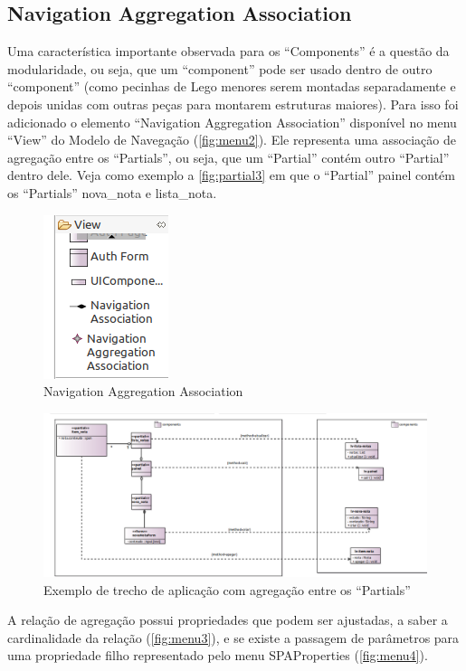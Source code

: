 \documentclass[
article,			%
11pt,				%
oneside,			%
a4paper,			%
english,			%
brazil,				%
sumario=tradicional
]{abntex2}
\begin{document}
\subsection{Navigation Aggregation Association}

Uma característica importante observada para os ``Components'' é a questão da modularidade, ou seja, que um ``component'' pode ser usado dentro de outro ``component'' (como pecinhas de Lego menores serem montadas separadamente e depois unidas com outras peças para montarem estruturas maiores). Para isso foi adicionado o elemento ``Navigation Aggregation Association'' disponível no menu ``View'' do Modelo de Navegação (\autoref{fig:menu2}). Ele representa uma associação de agregação entre os ``Partials'', ou seja, que um ``Partial'' contém outro ``Partial'' dentro dele. Veja como exemplo a \autoref{fig:partial3} em que o ``Partial'' painel contém os ``Partials'' nova\_nota e lista\_nota.

\begin{figure}
	\centering
	\includegraphics[width=0.3\linewidth]{figuras/menu2}
	\caption{Navigation Aggregation Association}
	\label{fig:menu2}
\end{figure}

\begin{figure}
	\centering
	\includegraphics[width=0.7\linewidth]{figuras/Partial3}
	\caption{Exemplo de trecho de aplicação com agregação entre os ``Partials''}
	\label{fig:partial3}
\end{figure}

A relação de agregação possui propriedades que podem ser ajustadas, a saber a cardinalidade da relação (\autoref{fig:menu3}), e se existe a passagem de parâmetros para uma propriedade filho representado pelo menu SPAProperties (\autoref{fig:menu4}).
\end{document}
